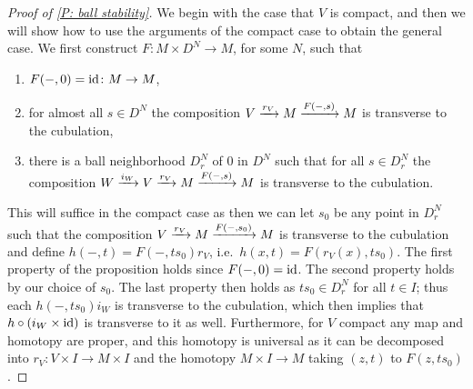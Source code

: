 \begin{proof}[Proof of \cref{P: ball stability}]
We begin with the case that $V$ is compact, and then we will show how to use the arguments of the compact case to obtain the general case. We first construct $F \colon M \times D^N \to M$, for some $N$, such that

\begin{enumerate}

\item $F(-,0) = \mathrm{id} \colon M \to M$,
\item for almost all $s \in D^N$ the composition $V \xrightarrow{r_V} M \xrightarrow{F(-,s)}M$ is transverse to the cubulation,

\item there is a ball neighborhood $D_r^N$ of $0$ in $D^N$ such that for all $s \in D_r^N$ the composition $W \xrightarrow{i_{W}} V \xrightarrow{r_V} M \xrightarrow{F(-,s)}M$ is transverse to the cubulation.
\end{enumerate}

This will suffice in the compact case as then we can let $s_0$ be any point in $D_r^N$ such that the composition $V \xrightarrow{r_V} M \xrightarrow{F(-,s_0)}M$ is transverse to the cubulation and define $h(-,t) = F(-,ts_0)r_V$, i.e.\ $h(x,t) = F(r_V(x),ts_0)$. The first property of the proposition holds since $F(-,0) = \mathrm{id}$. The second property holds by our choice of $s_0$. The last property then holds as $ts_0 \in D_r^N$ for all $t \in I$; thus each $h(-,ts_0)i_W$ is transverse to the cubulation, which then implies that $h\circ(i_{W} \times \mathrm{id})$ is transverse to it as well. Furthermore, for $V$ compact any map and homotopy are proper, and this homotopy is universal as it can be decomposed into $r_V \colon V \times I \to M \times I$ and the homotopy $M \times I \to M$ taking $(z,t)$ to $F(z,ts_0)$.


\end{proof}
